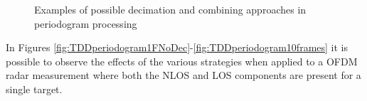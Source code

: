 \begin{figure}[H]
		        \hfill
		        
		        \caption{Examples of possible decimation and combining approaches in periodogram processing}
		        \label{fig:allperiodogram-decimation}
		    \end{figure}
		
		    In Figures \ref{fig:TDDperiodogram1FNoDec}-\ref{fig:TDDperiodogram10frames} it is possible to observe the effects of the various strategies when applied to a OFDM radar measurement where both the NLOS and LOS components are present for a single target.
		
		
		    
